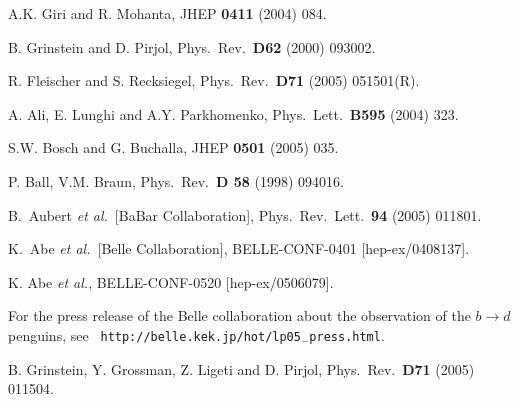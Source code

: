 \documentclass[11pt]{cernrep}
\begin{document}
\begin{thebibliography}{999}
A.K. Giri and R. Mohanta,
  { JHEP} {\bf 0411} (2004) 084.
  
B. Grinstein and D. Pirjol,
{ Phys.\ Rev.}~{\bf D62} (2000) 093002.

R. Fleischer and S. Recksiegel,
  { Phys.\ Rev.}~{\bf D71} (2005) 051501(R).

A. Ali, E. Lunghi and A.Y. Parkhomenko,
{ Phys.\ Lett.}~{\bf B595} (2004) 323.

S.W. Bosch and G. Buchalla,
  { JHEP} {\bf 0501} (2005) 035.

P. Ball, V.M. Braun,
{ Phys.\ Rev.}~{\bf D 58} (1998) 094016.

B.~Aubert {\it et al.}\  [BaBar Collaboration],
{ Phys.\ Rev.\ Lett.}~{\bf 94} (2005) 011801.

K.~Abe {\it et al.}\  [Belle Collaboration],
BELLE-CONF-0401 [hep-ex/0408137].

K. Abe {\it et al.},
  BELLE-CONF-0520 [hep-ex/0506079].
  
For the press release of the Belle collaboration about the 
observation of the $b\to d$ penguins, see {\tt 
http://belle.kek.jp/hot/lp05$\mbox{}_-$press.html}.

B. Grinstein, Y. Grossman, Z. Ligeti and D. Pirjol,
  { Phys.\ Rev.}~{\bf D71} (2005) 011504.


\end{thebibliography}
\end{document}
